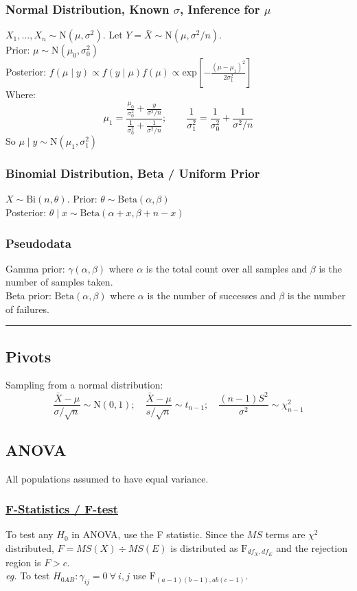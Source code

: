 \documentclass{article}
\begin{document}
\begin{multicols*}{2}
\subsubsection*{Normal Distribution, Known $\sigma$, Inference for $\mu$}
$X_{1}, \dots, X_{n} \sim \mbox{N}(\mu, \sigma^{2})$. Let $Y = \bar{X} \sim \mbox{N}(\mu, \sigma^{2}/n)$.\\
Prior: $\mu \sim \mbox{N}(\mu_{0}, \sigma^{2}_{0})$\\
Posterior: $f(\mu \mid y) \propto f(y \mid \mu) f(\mu) \propto \mbox{exp}\left[ -\frac{(\mu - \mu_{1})^{2}}{2 \sigma^{2}_{1}} \right]$\\
Where:
$$\mu_{1} = \frac{\frac{\mu_{0}}{\sigma^{2}_{0}} + \frac{y}{\sigma^{2}/n}}{\frac{1}{\sigma^{2}_{0}} + \frac{1}{\sigma^{2}/n}}; \qquad \frac{1}{\sigma^{2}_{1}} = \frac{1}{\sigma^{2}_{0}} + \frac{1}{\sigma^{2} / n}$$
So $\mu \mid y \sim \mbox{N}(\mu_{1}, \sigma^{2}_{1})$
\subsubsection*{Binomial Distribution, Beta / Uniform Prior}
$X \sim \mbox{Bi}(n, \theta)$. Prior: $\theta \sim \mbox{Beta}(\alpha, \beta)$\\
Posterior: $\theta \mid x \sim \mbox{Beta}(\alpha + x, \beta + n - x)$
\subsubsection*{Pseudodata}
Gamma prior: $\gamma(\alpha, \beta)$ where $\alpha$ is the total count over all samples and $\beta$ is the number of samples taken.\\
Beta prior: $\mbox{Beta}(\alpha, \beta)$ where $\alpha$ is the number of successes and $\beta$ is the number of failures.

\noindent\rule{\linewidth}{0.25pt}
\subsection*{Pivots}
Sampling from a normal distribution:
$$\frac{\bar{X} - \mu}{\sigma / \sqrt{n}} \sim \mbox{N}(0, 1); \quad \frac{\bar{X} - \mu}{s / \sqrt{n}} \sim t_{n-1}; \quad \frac{(n-1)S^{2}}{\sigma^{2}} \sim \chi^{2}_{n-1}$$

\newpage
\subsection*{ANOVA}
All populations assumed to have equal variance.
\subsubsection*{\underline{F-Statistics / F-test}}
To test any $H_{0}$ in ANOVA, use the F statistic. Since the $MS$ terms are $\chi^{2}$ distributed, $F = MS(X) \div MS(E)$ is distributed as $\mbox{F}_{df_{X}, df_{E}}$ and the rejection region is $F > c$.\\
\textit{eg.} To test $H_{0AB}: \gamma_{ij} = 0\ \forall\ i, j$ use $\mbox{F}_{(a-1)(b-1), ab(c-1)}$.


\end{multicols*}
\end{document}
